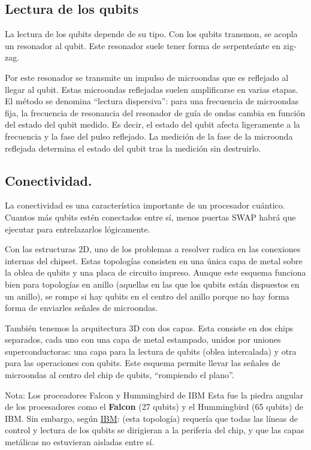 \subsection{Lectura de los qubits}

La lectura de los qubits depende de su tipo. Con los qubits transmon, se acopla un resonador al qubit. Este resonador suele tener forma de serpenteánte en zig-zag. 

Por este resonador se transmite un impulso de microondas que es reflejado al llegar al qubit. Estas microondas reflejadas suelen amplificarse en varias etapas. El método se denomina ``lectura dispersiva'': para una frecuencia de microondas fija, la frecuencia de resonancia del resonador de guía de ondas cambia en función del estado del qubit medido. Es decir, el estado del qubit afecta ligeramente a la frecuencia y la fase del pulso reflejado. La medición de la fase de la microonda reflejada determina el estado del qubit tras la medición sin destruirlo.  


\subsection{Conectividad.}

La conectividad es una característica importante de un procesador cuántico. Cuantos más qubits estén conectados entre sí, menos puertas SWAP habrá que ejecutar para entrelazarlos lógicamente.

Con las estructuras 2D, uno de los problemas a resolver radica en las conexiones internas del chipset. Estas topologías consisten en una única capa de metal sobre la oblea de qubits y una placa de circuito impreso. Aunque este esquema funciona bien para topologías en anillo (aquellas en las que los qubits están dispuestos en un anillo), se rompe si hay qubits en el centro del anillo porque no hay forma forma de enviarles señales de microondas. 

También tenemos la arquitectura 3D con dos capas. Esta consiste en dos chips separados, cada uno con una capa de metal estampado, unidos por uniones superconductoras: una capa para la lectura de qubits (oblea intercalada) y otra para las operaciones con qubits. Este esquema permite llevar las señales de microondas al centro del chip de qubits, ``rompiendo el plano''. 

\begin{mybox_blue}{Nota: Los proceadores Falcon y Hummingbird de IBM}
Esta fue la piedra angular de los procesadores como el \textbf{Falcon} (27 qubits) y el Hummingbird (65 qubits) de IBM. Sin embargo, según \href{https://www.ibm.com/quantum/blog/eagle-quantum-processor-performance}{IBM}: (esta topología) requería que todas las líneas de control y lectura de los qubits se dirigieran a la periferia del chip, y que las capas metálicas no estuvieran aisladas entre sí.

\end{mybox_blue}

